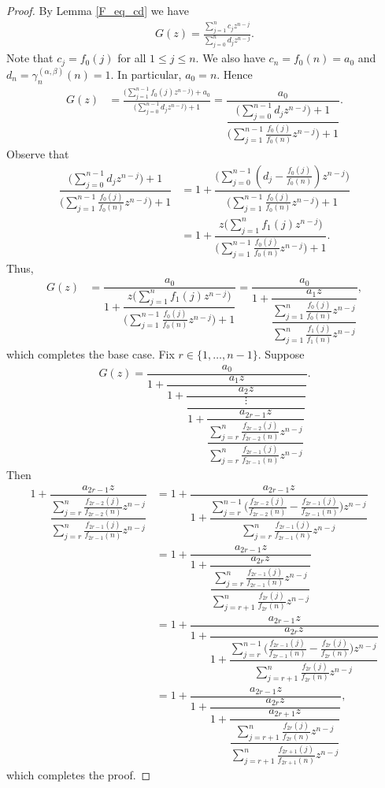 \documentclass{amsart}
\theoremstyle{plain}
\theoremstyle{remark}
\begin{document}
\begin{proof}
By Lemma \ref{F_eq_cd} we have
\begin{align*}
    G(z)=\frac{\sum_{j=1}^{n}c_jz^{n-j}}{\sum_{j=0}^nd_jz^{n-j}}.
\end{align*}
Note that $c_j=f_0(j)$ for all $1\le j\le n$. We also have $c_n=f_0(n)=a_0$ and $d_n=\gamma_n^{(\alpha,\beta)}(n)=1$. In particular, $a_0 = n$. Hence
\begin{align*}
    G(z)&=\frac{\bigg(\sum_{j=1}^{n-1}f_0(j)z^{n-j}\bigg)+a_0}{\bigg(\sum_{j=0}^{n-1}d_jz^{n-j}\bigg)+1} =\dfrac{a_0}{\dfrac{\bigg(\sum_{j=0}^{n-1}d_jz^{n-j}\bigg)+1}{\bigg(\sum_{j=1}^{n-1}\frac{f_0(j)}{f_0(n)}z^{n-j}\bigg)+1}}.
\end{align*}
Observe that 
\begin{align*}
{\dfrac{\bigg(\sum_{j=0}^{n-1}d_jz^{n-j}\bigg)+1}{\bigg(\sum_{j=1}^{n-1}\frac{f_0(j)}{f_0(n)}z^{n-j}\bigg)+1}} &= {1+\dfrac{\bigg(\sum_{j=0}^{n-1}(d_j-\frac{f_0(j)}{f_0(n)})z^{n-j}\bigg)}{\bigg(\sum_{j=1}^{n-1}\frac{f_0(j)}{f_0(n)}z^{n-j}\bigg)+1}} \\
&={1+\dfrac{z\bigg(\sum_{j=1}^nf_1(j)z^{n-j}\bigg)}{\bigg(\sum_{j=1}^{n-1}\frac{f_0(j)}{f_0(n)}z^{n-j}\bigg)+1}}.
\end{align*}
Thus,
\begin{align*}    
     G(z)&=\dfrac{a_0}{1+\dfrac{z\bigg(\sum_{j=1}^nf_1(j)z^{n-j}\bigg)}{\bigg(\sum_{j=1}^{n-1}\frac{f_0(j)}{f_0(n)}z^{n-j}\bigg)+1}}
    =\dfrac{a_0}{1+\dfrac{a_1z}{\dfrac{\sum_{j=1}^n\frac{f_0(j)}{f_0(n)}z^{n-j}}{\sum_{j=1}^n\frac{f_1(j)}{f_1(n)}z^{n-j}}}},
\end{align*}
which completes the base case. Fix $r\in\{1,\ldots,n-1\}$. Suppose 
\begin{align*}
G(z)=\dfrac{a_0}{1+\dfrac{a_1z}{1+\dfrac{a_2z}{\dfrac{\vdots}{1+\dfrac{a_{2r-1}z}{\dfrac{\sum_{j=r}^n\frac{f_{2r-2}(j)}{f_{2r-2}(n)}z^{n-j}}{\sum_{j=r}^n\frac{f_{2r-1}(j)}{f_{2r-1}(n)}z^{n-j}}}}}}}.
\end{align*}
Then
\begin{align*}
{1+\dfrac{a_{2r-1}z}{\dfrac{\sum_{j=r}^n\frac{f_{2r-2}(j)}{f_{2r-2}(n)}z^{n-j}}{\sum_{j=r}^n\frac{f_{2r-1}(j)}{f_{2r-1}(n)}z^{n-j}}}} &=
{1+\dfrac{a_{2r-1}z}{1+\dfrac{\sum_{j=r}^{n-1}\bigg(\frac{f_{2r-2}(j)}{f_{2r-2}(n)}-\frac{f_{2r-1}(j)}{f_{2r-1}(n)}\bigg)z^{n-j}}{\sum_{j=r}^n\frac{f_{2r-1}(j)}{f_{2r-1}(n)}z^{n-j}}}} \\
&={1+\dfrac{a_{2r-1}z}{1+\dfrac{a_{2r}z}{\dfrac{\sum_{j=r}^n\frac{f_{2r-1}(j)}{f_{2r-1}(n)}z^{n-j}}{\sum_{j=r+1}^{n}\frac{f_{2r}(j)}{f_{2r}(n)}z^{n-j}}}}} \\
&={1+\dfrac{a_{2r-1}z}{1+\dfrac{a_{2r}z}{1+\dfrac{\sum_{j=r}^{n-1}\big(\frac{f_{2r-1}(j)}{f_{2r-1}(n)}-\frac{f_{2r}(j)}{f_{2r}(n)}\big)z^{n-j}}{\sum_{j=r+1}^{n}\frac{f_{2r}(j)}{f_{2r}(n)}z^{n-j}}}}}\\
&={1+\dfrac{a_{2r-1}z}{1+\dfrac{a_{2r}z}{1+\dfrac{a_{2r+1}z}{\dfrac{\sum_{j=r+1}^{n}\frac{f_{2r}(j)}{f_{2r}(n)}z^{n-j}}{\sum_{j=r+1}^{n}\frac{f_{2r+1}(j)}{f_{2r+1}(n)}z^{n-j}}}}}},
\end{align*}
which completes the proof.
\end{proof}
\end{document}
